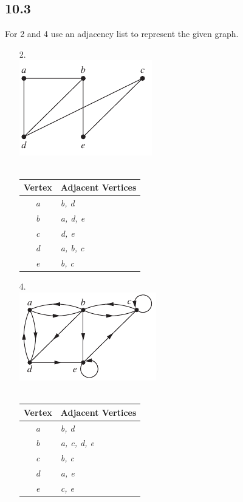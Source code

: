 \subsection{10.3}
For 2 and 4 use an adjacency list to represent the given graph.
\begin{itemize}
      \item[2.] \text{}\\
            \includegraphics[scale = 0.7]{img/10_3_2_graph.png} \\
            \answer \vspace{1mm} \\
            \begin{tabular}{c|l}
                  Vertex     & Adjacent Vertices \\
                  \hline
                  \textit{a} & \textit{b, d}     \\
                  \textit{b} & \textit{a, d, e}  \\
                  \textit{c} & \textit{d, e}     \\
                  \textit{d} & \textit{a, b, c}  \\
                  \textit{e} & \textit{b, c}
            \end{tabular}

      \item[4.] \text{}\\
            \includegraphics[scale = 0.7]{img/10_3_4_graph.png} \\
            \answer \vspace{1mm}\\
            \begin{tabular}{c|l}
                  Vertex     & Adjacent Vertices   \\
                  \hline
                  \textit{a} & \textit{b, d}       \\
                  \textit{b} & \textit{a, c, d, e} \\
                  \textit{c} & \textit{b, c}       \\
                  \textit{d} & \textit{a, e}       \\
                  \textit{e} & \textit{c, e}
            \end{tabular}


\end{itemize}
